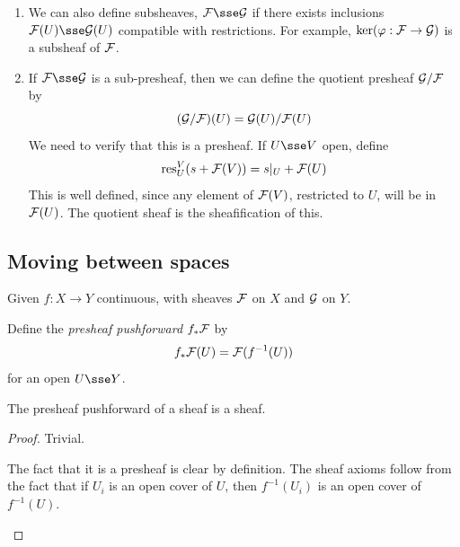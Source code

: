\documentclass{article}
\begin{document}
\begin{remark}
    \begin{enumerate}
        \item We can also define subsheaves, \(\mcF \sse \mcG\) if there exists inclusions \(\mcF(U) \sse \mcG(U)\) compatible with restrictions. For example, \(\ker(\varphi : \mathcal{F} \to \mathcal{G})\) is a subsheaf of \(\mathcal{F}\).
        \item \begin{addendum}
            If \(\mcF \sse \mcG\) is a sub-presheaf, then we can define the quotient presheaf \(\mathcal{G}/\mathcal{F}\) by
            \[(\mathcal{G}/\mathcal{F})(U) = \mathcal{G}(U)/\mathcal{F}(U)\]
            We need to verify that this is a presheaf. If \(U \sse V\) open, define
            \[\operatorname{res}^V_U(s + \mathcal{F}(V)) = s\vert_U + \mathcal{F}(U)\]
            This is well defined, since any element of \(\mathcal{F}(V)\), restricted to \(U\), will be in \(\mathcal{F}(U)\). The quotient sheaf is the sheafification of this.
        \end{addendum}
    \end{enumerate}
\end{remark}

\lec

\subsection{Moving between spaces}

Given \(f : X \to Y\) continuous, with sheaves \(\mathcal{F}\) on \(X\) and \(\mathcal{G}\) on \(Y\).

\begin{definition}
     Define the \emph{presheaf pushforward} \(f_*\mathcal{F}\) by
    \[f_*\mathcal{F}(U) = \mathcal{F}(f^{-1}(U))\]
    for an open \(U \sse Y\).
\end{definition}

\begin{proposition}
    The presheaf pushforward of a sheaf is a sheaf.
\end{proposition}

\begin{proof}
    Trivial. \begin{addendum}
        The fact that it is a presheaf is clear by definition. The sheaf axioms follow from the fact that if \(U_i\) is an open cover of \(U\), then \(f^{-1}(U_i)\) is an open cover of \(f^{-1}(U)\).
    \end{addendum}
\end{proof}
\end{document}
